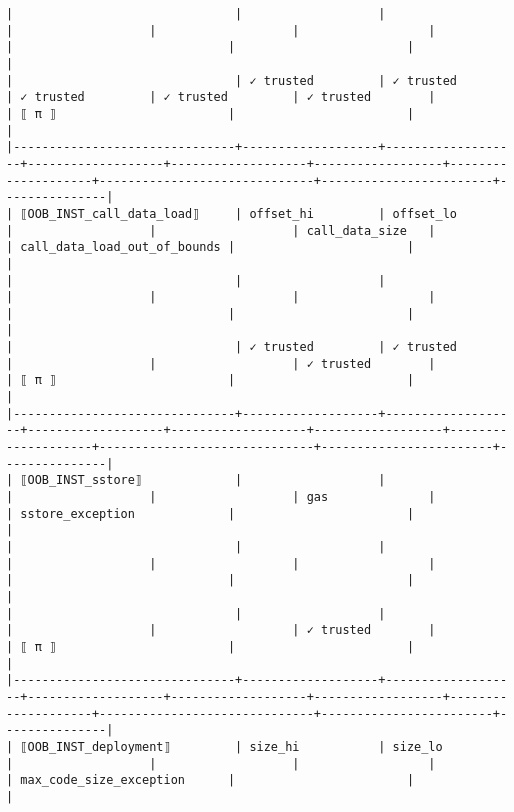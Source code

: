 \documentclass[varwidth=\maxdimen,margin=0.5cm,multi={verbatim}]{standalone}
\begin{document}
\begin{verbatim}
|                               |                   |                   |                   |                   |                  |                    |                              |                        |               |
|                               | ✓ trusted         | ✓ trusted         | ✓ trusted         | ✓ trusted         | ✓ trusted        |                    | ⟦ π ⟧                        |                        |               |
|-------------------------------+-------------------+-------------------+-------------------+-------------------+------------------+--------------------+------------------------------+------------------------+---------------|
| ⟦OOB_INST_call_data_load⟧     | offset_hi         | offset_lo         |                   |                   | call_data_size   |                    | call_data_load_out_of_bounds |                        |               |
|                               |                   |                   |                   |                   |                  |                    |                              |                        |               |
|                               | ✓ trusted         | ✓ trusted         |                   |                   | ✓ trusted        |                    | ⟦ π ⟧                        |                        |               |
|-------------------------------+-------------------+-------------------+-------------------+-------------------+------------------+--------------------+------------------------------+------------------------+---------------|
| ⟦OOB_INST_sstore⟧             |                   |                   |                   |                   | gas              |                    | sstore_exception             |                        |               |
|                               |                   |                   |                   |                   |                  |                    |                              |                        |               |
|                               |                   |                   |                   |                   | ✓ trusted        |                    | ⟦ π ⟧                        |                        |               |
|-------------------------------+-------------------+-------------------+-------------------+-------------------+------------------+--------------------+------------------------------+------------------------+---------------|
| ⟦OOB_INST_deployment⟧         | size_hi           | size_lo           |                   |                   |                  |                    | max_code_size_exception      |                        |               |

\end{verbatim}
\end{document}

